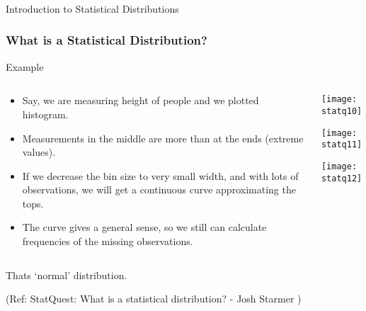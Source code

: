 \begin{frame}[fragile]\frametitle{}
\begin{center}
{\Large Introduction to Statistical Distributions}
\end{center}
\end{frame}


\begin{frame}[fragile]\frametitle{What is a Statistical Distribution?}

Example
\begin{columns}
    \begin{column}[T]{0.6\linewidth}
	\begin{itemize}
	\item Say, we are measuring height of people and we plotted histogram.
	\item Measurements in the middle are more than at the ends (extreme values).
	\item If we decrease the bin size to very small width, and with lots of observations, we will get a continuous curve approximating the tops.
	\item The curve gives a general sense, so we still can calculate frequencies of the missing observations.
	\end{itemize}

    \end{column}
    \begin{column}[T]{0.4\linewidth}
      \begin{center}
      \texttt{[image: statq10]}
	  
	  \texttt{[image: statq11]}
	  
	  \texttt{[image: statq12]}	  
	  	\end{center}
    \end{column}

  \end{columns}
  
Thats `normal' distribution.

\tiny{(Ref: StatQuest: What is a statistical distribution? - Josh Starmer )}
\end{frame}


